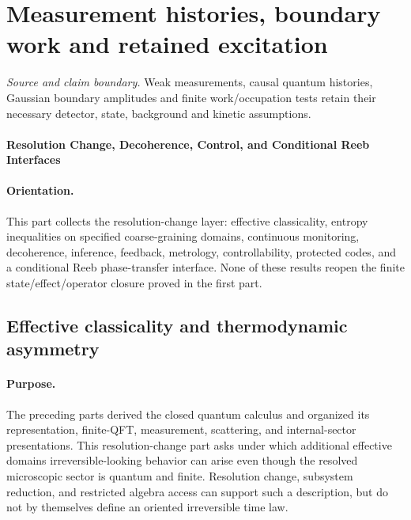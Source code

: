 \documentclass[12pt,a4paper]{article}
\begin{document}




\setlength{\emergencystretch}{2em}


\section{Measurement histories, boundary work and retained excitation}
\label{p4b:sec:v238-b7}
\noindent\textit{Source and claim boundary.} Weak measurements, causal quantum histories, Gaussian boundary amplitudes and finite work/occupation tests retain their necessary detector, state, background and kinetic assumptions.

\paragraph{Resolution Change, Decoherence, Control, and Conditional Reeb Interfaces}
\label{p4:part:part3}

\paragraph{Orientation.}
This part collects the resolution-change layer: effective classicality,
entropy inequalities on specified coarse-graining domains, continuous
monitoring, decoherence, inference, feedback, metrology, controllability,
protected codes, and a conditional Reeb phase-transfer interface.  None of
these results reopen the finite state/effect/operator closure proved in the
first part.



\subsection[Why effective classicality and thermodynamic asymmetry can appear]
{Effective classicality and thermodynamic asymmetry}
\label{p4:sec:part3-classicality-entropy}

\paragraph{Purpose.}
The preceding parts derived the closed quantum calculus and organized its representation, finite-QFT, measurement, scattering, and internal-sector presentations.
This resolution-change part asks under which additional effective domains
irreversible-looking behavior can arise even though the resolved microscopic
sector is quantum and finite.  Resolution change, subsystem reduction, and
restricted algebra access can support such a description, but do not by
themselves define an oriented irreversible time law.
\end{document}
